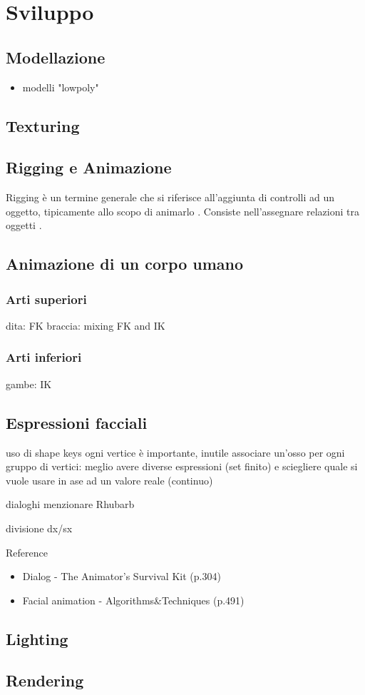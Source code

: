 
\chapter{Sviluppo} %

\label{Chapter5} %


\section{Modellazione}
\begin{itemize}
    \item modelli "lowpoly"
\end{itemize}
\section{Texturing}
\section{Rigging e Animazione}
Rigging è un termine generale che si riferisce all'aggiunta di controlli ad un oggetto, tipicamente allo scopo di animarlo \parencite{blendDoc}.
Consiste nell'assegnare relazioni tra oggetti \parencite{BlendTut}.
\section{Animazione di un corpo umano}
\subsection{Arti superiori}
dita: FK
braccia: mixing FK and IK
\subsection{Arti inferiori}
gambe: IK
\section{Espressioni facciali}
uso di shape keys
ogni vertice è importante, inutile associare un'osso per ogni gruppo di vertici: meglio avere diverse espressioni (set finito) e sciegliere quale si vuole usare in ase ad un valore reale (continuo)

dialoghi
menzionare Rhubarb

divisione dx/sx

Reference
\begin{itemize}
    \item Dialog - The Animator's Survival Kit (p.304) 
    \item Facial animation - Algorithms\&Techniques (p.491)
\end{itemize}
\section{Lighting}
\section{Rendering}


